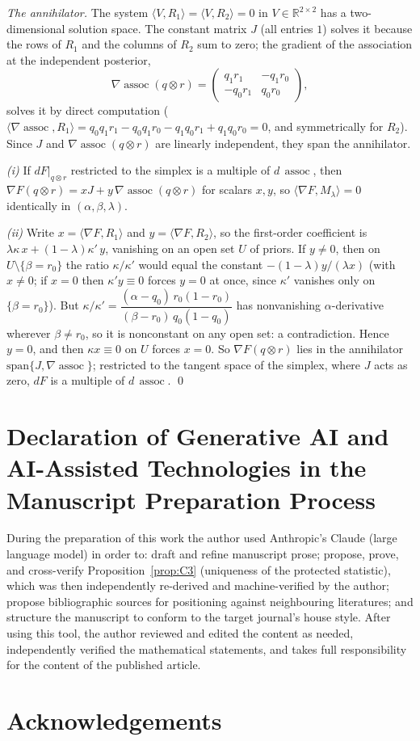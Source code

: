 \documentclass[review,12pt,authoryear]{elsarticle}
\theoremstyle{remark}
\theoremstyle{definition}
\newcommand{\assoc}{\operatorname{assoc}}
\begin{document}
\emph{The annihilator.} The system $\langle V,R_1\rangle=\langle V,R_2\rangle=0$ in
$V\in\mathbb{R}^{2\times2}$ has a two-dimensional solution space. The constant matrix $J$ (all
entries $1$) solves it because the rows of $R_1$ and the columns of $R_2$ sum to zero; the
gradient of the association at the independent posterior,
\[
  \nabla\assoc(q\otimes r)=
  \begin{pmatrix} q_1r_1 & -q_1r_0\\ -q_0r_1 & q_0r_0\end{pmatrix},
\]
solves it by direct computation
($\langle\nabla\assoc,R_1\rangle=q_0q_1r_1-q_0q_1r_0-q_1q_0r_1+q_1q_0r_0=0$, and symmetrically
for $R_2$). Since $J$ and $\nabla\assoc(q\otimes r)$ are linearly independent, they span the
annihilator.

\emph{(i)} If $dF|_{q\otimes r}$ restricted to the simplex is a multiple of $d\,\assoc$, then
$\nabla F(q\otimes r)=xJ+y\,\nabla\assoc(q\otimes r)$ for scalars $x,y$, so
$\langle\nabla F,M_\lambda\rangle=0$ identically in $(\alpha,\beta,\lambda)$.

\emph{(ii)} Write $x=\langle\nabla F,R_1\rangle$ and $y=\langle\nabla F,R_2\rangle$, so the
first-order coefficient is $\lambda\kappa\,x+(1-\lambda)\kappa'\,y$, vanishing on an open set
$U$ of priors. If $y\neq0$, then on $U\setminus\{\beta=r_0\}$ the ratio $\kappa/\kappa'$ would
equal the constant $-(1-\lambda)y/(\lambda x)$ (with $x\neq0$; if $x=0$ then $\kappa'y\equiv0$
forces $y=0$ at once, since $\kappa'$ vanishes only on $\{\beta=r_0\}$). But
$\kappa/\kappa'=\dfrac{(\alpha-q_0)\,r_0(1-r_0)}{(\beta-r_0)\,q_0(1-q_0)}$ has nonvanishing
$\alpha$-derivative wherever $\beta\neq r_0$, so it is nonconstant on any open set: a
contradiction. Hence $y=0$, and then $\kappa x\equiv0$ on $U$ forces $x=0$. So
$\nabla F(q\otimes r)$ lies in the annihilator $\mathrm{span}\{J,\nabla\assoc\}$; restricted to
the tangent space of the simplex, where $J$ acts as zero, $dF$ is a multiple of $d\,\assoc$.
\qed

\section*{Declaration of Generative AI and AI-Assisted Technologies in the Manuscript Preparation Process}

During the preparation of this work the author used Anthropic's Claude (large language model)
in order to: draft and refine manuscript prose; propose, prove, and cross-verify
Proposition~\ref{prop:C3} (uniqueness of the protected statistic), which was then independently
re-derived and machine-verified by the author; propose bibliographic sources for
positioning against neighbouring literatures; and structure the manuscript to conform to the
target journal's house style. After using this tool, the author reviewed and edited the
content as needed, independently verified the mathematical statements, and takes full
responsibility for the content of the published article.

\section*{Acknowledgements}




\end{document}
